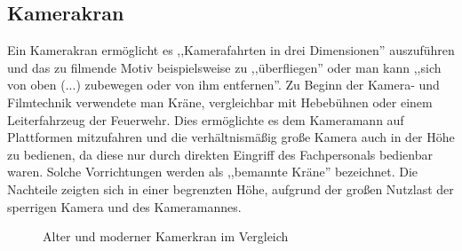 \documentclass[a4paper, 12pt, bibtotocnumbered, liststotocnumbered]{scrartcl}
\begin{document}
	\subsection{Kamerakran}
	Ein Kamerakran ermöglicht es ,,Kamerafahrten in drei Dimensionen”\cite{wikipedia-kamerakran} auszuführen und das zu filmende Motiv beispielsweise zu ,,überfliegen”\cite{wikipedia-kamerakran} oder man kann ,,sich von oben (...) zubewegen oder von ihm entfernen”\cite{wikipedia-kamerakran}. Zu Beginn der Kamera- und Filmtechnik verwendete man Kräne, vergleichbar mit Hebebühnen oder einem Leiterfahrzeug der Feuerwehr. Dies ermöglichte es dem Kameramann auf Plattformen mitzufahren und die verhältnismäßig große Kamera auch in der Höhe zu bedienen, da diese nur durch direkten Eingriff des Fachpersonals bedienbar waren. Solche Vorrichtungen werden als ,,bemannte Kräne”\cite{wikipedia-kamerakran} bezeichnet. Die Nachteile zeigten sich in einer begrenzten Höhe, aufgrund der großen Nutzlast der sperrigen Kamera und des Kameramannes.

	\begin{figure}[htb]
		\centering
		\hfill
		\caption[Quellen: \newline a) \url{http://www.flickr.com/photos/11695645@N04/2498906266/} \newline b) \url{http://de.wikipedia.org/wiki/Datei:Crane_shot.jpg}]{Alter und moderner Kamerkran im Vergleich}
	\end{figure}
\end{document}
